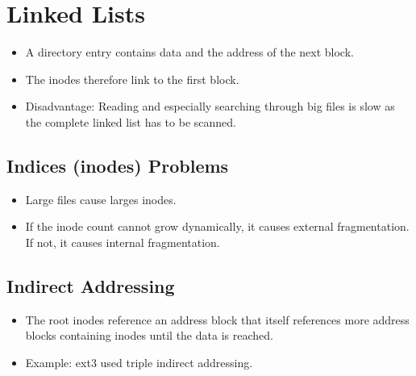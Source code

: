 		\section{Linked Lists}
			\begin{itemize}
				\item A directory entry contains data and the address of the next block.
				\item The inodes therefore link to the first block.
				\item Disadvantage: Reading and especially searching through big files is slow as the complete linked list has to be scanned.
			\end{itemize}

        \subsection{Indices (inodes) Problems}
            \begin{itemize}
            	\item Large files cause larges inodes.
            	\item If the inode count cannot grow dynamically, it causes external fragmentation. If not, it causes internal fragmentation.
            \end{itemize}
        
        \subsection{Indirect Addressing}
	        \begin{itemize}
	        	\item The root inodes reference an address block that itself references more address blocks containing inodes until the data is reached.
	        	\item Example: ext3 used triple indirect addressing.
	        \end{itemize}
        
